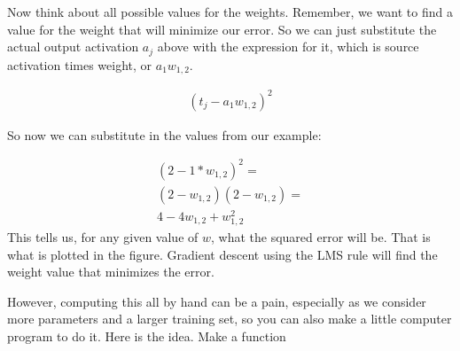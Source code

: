 Now think about all possible values for the weights. Remember, we want to find a value for the weight that will minimize our error. So we can just substitute the actual output activation $a_j$ above with the expression for it, which is source activation times weight, or  $a_1 w_{1,2}$.

\begin{eqnarray*}
(t_j - a_1 w_{1,2})^2
\end{eqnarray*}

So now we can substitute in the values from our example:

\begin{eqnarray*}
(2 - 1 * w_{1,2})^2 = \\
(2 - w_{1,2}) (2 - w_{1,2} ) =  \\
4-4w_{1,2}+w_{1,2}^2
\end{eqnarray*}
This tells us, for any given value of $w$, what the squared error will be. That is what is plotted in the figure. Gradient descent using the LMS rule will find the weight value that minimizes the error.

However, computing this all by hand can be  a pain, especially as we consider more parameters and a larger training set, so you can also make a little computer program to do it.  Here is the idea. Make a function

%
%
%
%

